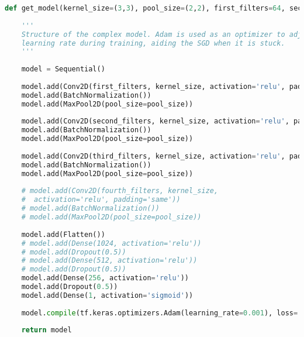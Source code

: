 \begin{lstlisting}[language=Python, caption=Model 6]
def get_model(kernel_size=(3,3), pool_size=(2,2), first_filters=64, second_filters=128, third_filters=256, fourth_filters=1024):
    
    '''
    Structure of the complex model. Adam is used as an optimizer to adjust the 
    learning rate during training, aiding the SGD when it is stuck.
    ''' 
    
    model = Sequential()    
    
    model.add(Conv2D(first_filters, kernel_size, activation='relu', padding='same', input_shape=(IMAGE_SIZE, IMAGE_SIZE, 3)))
    model.add(BatchNormalization())
    model.add(MaxPool2D(pool_size=pool_size))
    
    model.add(Conv2D(second_filters, kernel_size, activation='relu', padding='same'))
    model.add(BatchNormalization())
    model.add(MaxPool2D(pool_size=pool_size))
    
    model.add(Conv2D(third_filters, kernel_size, activation='relu', padding='same'))
    model.add(BatchNormalization())
    model.add(MaxPool2D(pool_size=pool_size))
    
    # model.add(Conv2D(fourth_filters, kernel_size, 
    #  activation='relu', padding='same'))
    # model.add(BatchNormalization())
    # model.add(MaxPool2D(pool_size=pool_size))
    
    model.add(Flatten())
    # model.add(Dense(1024, activation='relu'))
    # model.add(Dropout(0.5))
    # model.add(Dense(512, activation='relu'))
    # model.add(Dropout(0.5))
    model.add(Dense(256, activation='relu'))
    model.add(Dropout(0.5))
    model.add(Dense(1, activation='sigmoid'))
    
    model.compile(tf.keras.optimizers.Adam(learning_rate=0.001), loss='binary_crossentropy', metrics=['accuracy'])
    
    return model
\end{lstlisting}